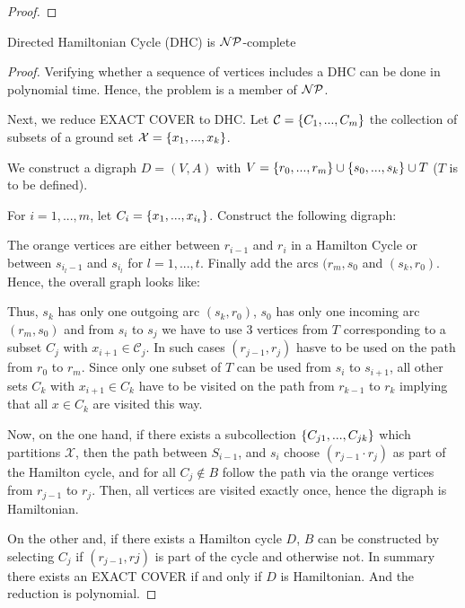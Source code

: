 \begin{lec}[2011-12-22]\end{lec}

\begin{proof} %
\end{proof}


\begin{thm}
Directed Hamiltonian Cycle (DHC) is $\mathcal{NP}$-complete
\end{thm}
\begin{proof}
	Verifying whether a sequence of vertices includes a DHC can be done in polynomial time. Hence, the problem is a member of $\mathcal{NP}$.
	
 Next, we reduce EXACT COVER to DHC. Let $\mathcal C=\left\{C_1, ..., C_m\right\}$ the collection of subsets of a ground set $\mathcal X = \left\{x_1, ..., x_k\right\}$.
 
 We construct a digraph $D=(V,A)$ with $V = \left\{r_0, ..., r_m\right\} \cup \left\{s_0, ..., s_k\right\} \cup T$ ($T$ is to be defined).
 
 For $i = 1, ..., m$, let $C_i = \left\{x_1, ..., x_{i_t}\right\}$. Construct the following digraph:


The orange vertices are either between $r_{i-1}$ and $r_i$ in a Hamilton Cycle or between $s_{i_l-1}$ and $s_{i_l}$ for $l = 1, ..., t$. Finally add the arcs $(r_m, s_0$ and $(s_k, r_0)$. Hence, the overall graph looks like:


Thus, $s_k$ has only one outgoing arc $(s_k, r_0)$, $s_0$ has only one incoming arc $(r_m, s_0)$ and from $s_i$ to $s_j$ we have to use 3 vertices from $T$ corresponding to a subset $C_j$ with $x_{i+1}\in \mathcal C_j$. In such cases $(r_{j-1}, r_j)$ hasve to be used on the path from $r_0$ to $r_m$. Since only one subset of $T$ can be used from $s_i$ to $s_{i+1}$, all other sets $C_k$ with $x_{i+1} \in C_k$ have to be visited on the path from $r_{k-1}$ to $r_k$ implying that all $x \in C_k$ are visited this way.

Now, on the one hand, if there exists a subcollection $\left\{C_{j1},...,C_{jk}\right\}$ which partitions $ \mathcal X$, then the path between $S_{i-1}$, and $s_i$ choose $(r_{j-1}· r_j)$ as part of the Hamilton cycle, and for all $C_j \not\in B$ follow the path via the orange vertices from $r_{j-1}$ to $r_j$. Then, all vertices are visited exactly once, hence the digraph is Hamiltonian.

On the other and, if there exists a Hamilton cycle $D$, $B$ can be constructed by selecting $C_j$ if $(r_{j-1},rj)$ is part of the cycle and otherwise not. In summary there exists an EXACT COVER if and only if $D$ is Hamiltonian. And the reduction is polynomial.

\end{proof}

